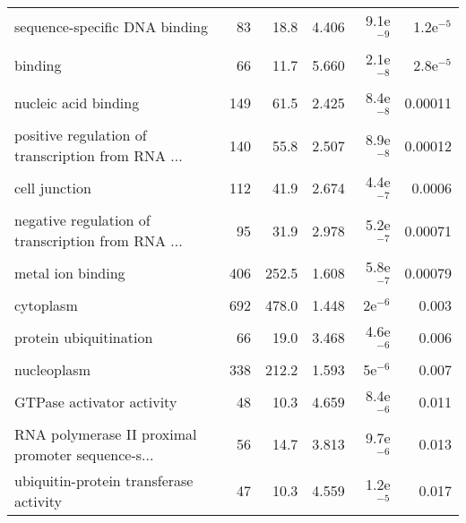 \begin{longtable}{lrrrrr}
                     sequence-specific DNA binding &                      83 &                    18.8 &      4.406 &          9.1e$^{-9}$ &          1.2e$^{-5}$ \\
                                           binding &                      66 &                    11.7 &      5.660 &          2.1e$^{-8}$ &          2.8e$^{-5}$ \\
                              nucleic acid binding &                     149 &                    61.5 &      2.425 &          8.4e$^{-8}$ &              0.00011 \\
 positive regulation of transcription from RNA ... &                     140 &                    55.8 &      2.507 &          8.9e$^{-8}$ &              0.00012 \\
                                     cell junction &                     112 &                    41.9 &      2.674 &          4.4e$^{-7}$ &               0.0006 \\
 negative regulation of transcription from RNA ... &                      95 &                    31.9 &      2.978 &          5.2e$^{-7}$ &              0.00071 \\
                                 metal ion binding &                     406 &                   252.5 &      1.608 &          5.8e$^{-7}$ &              0.00079 \\
                                         cytoplasm &                     692 &                   478.0 &      1.448 &            2e$^{-6}$ &                0.003 \\
                            protein ubiquitination &                      66 &                    19.0 &      3.468 &          4.6e$^{-6}$ &                0.006 \\
                                       nucleoplasm &                     338 &                   212.2 &      1.593 &            5e$^{-6}$ &                0.007 \\
                         GTPase activator activity &                      48 &                    10.3 &      4.659 &          8.4e$^{-6}$ &                0.011 \\
 RNA polymerase II proximal promoter sequence-s... &                      56 &                    14.7 &      3.813 &          9.7e$^{-6}$ &                0.013 \\
            ubiquitin-protein transferase activity &                      47 &                    10.3 &      4.559 &          1.2e$^{-5}$ &                0.017 \\

\end{longtable}
